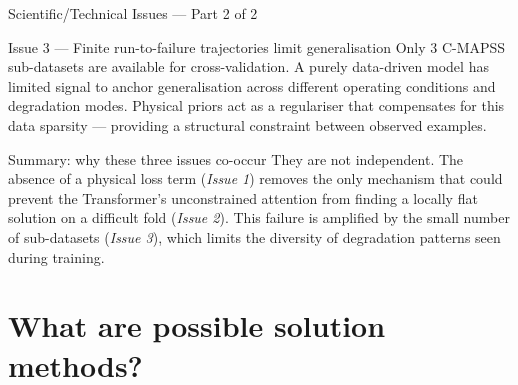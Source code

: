 \documentclass[10pt, aspectratio=169, handout]{beamer}
\begin{document}
\begin{frame}{Scientific/Technical Issues --- Part 2 of 2}
  \begin{block}{Issue 3 --- Finite run-to-failure trajectories limit generalisation}
    \small
    Only 3 C-MAPSS sub-datasets are available for cross-validation.  A purely data-driven
    model has limited signal to anchor generalisation across different operating conditions
    and degradation modes.  Physical priors act as a regulariser that compensates for this
    data sparsity --- providing a structural constraint between observed examples.
  \end{block}
  \vspace{10pt}
  \begin{exampleblock}{Summary: why these three issues co-occur}
    \small
    They are not independent.  The absence of a physical loss term (\emph{Issue 1}) removes
    the only mechanism that could prevent the Transformer's unconstrained attention from
    finding a locally flat solution on a difficult fold (\emph{Issue 2}).  This failure is
    amplified by the small number of sub-datasets (\emph{Issue 3}), which limits the
    diversity of degradation patterns seen during training.
  \end{exampleblock}
\end{frame}

\section{What are possible solution methods?}
\end{document}
